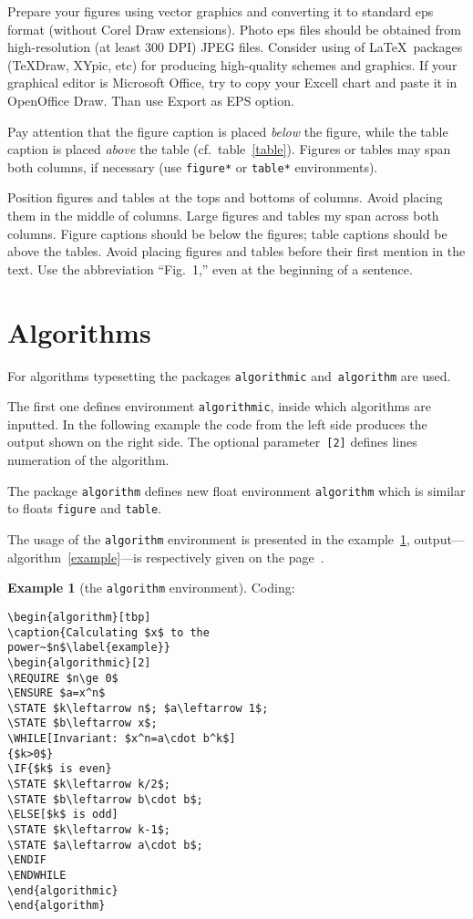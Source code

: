 \documentclass[conference]{IEEEtran}
\theoremstyle{definition}
\newtheorem{example}[remark]{Example}
\begin{document}
Prepare your figures using vector graphics and converting it to standard eps format (without Corel Draw extensions). Photo eps files should be obtained from high-resolution (at least 300 DPI) JPEG files. Consider using of \LaTeX\ packages (TeXDraw, XYpic, etc) for producing high-quality schemes and graphics. If your graphical editor is Microsoft Office, try to copy your Excell chart and paste it in OpenOffice Draw. Than use Export as EPS option.


Pay attention that the figure caption is placed \emph{below} the figure, while the table caption is placed \emph{above} the table (cf.~table~\ref{table}). Figures or tables may span both columns, if necessary (use \texttt{figure*} or \texttt{table*} environments).




Position figures and tables at the tops and bottoms of columns.  Avoid placing them in the middle of columns.  Large figures and tables my span across both columns.  Figure captions should be below the figures; table captions should be above the tables.  Avoid placing figures and tables before their first mention in the text.  Use the abbreviation ``Fig.~1,'' even at the beginning of a sentence.


\section{Algorithms}

For algorithms typesetting the packages \verb|algorithmic| and~\verb|algorithm| are used. 

The first one defines environment \verb|algorithmic|, inside which algorithms are inputted. In the following example the code from the left side produces the output shown on the right side. The optional parameter~\verb|[2]| defines lines numeration of the algorithm.

The  package \verb|algorithm| defines new float environment \verb|algorithm| which is  similar to floats \verb|figure| and \verb|table|. 

The usage of the \verb|algorithm| environment is presented in the example~\ref{algorytm}, output---algorithm~\ref{example}---is respectively given on the page~\pageref{example}.


\begin{example}[the \texttt{algorithm} environment]\label{algorytm}
Coding:\begin{verbatim}\begin{algorithm}[tbp]
\caption{Calculating $x$ to the 
power~$n$\label{example}}
\begin{algorithmic}[2]
\REQUIRE $n\ge 0$
\ENSURE $a=x^n$
\STATE $k\leftarrow n$; $a\leftarrow 1$; 
\STATE $b\leftarrow x$;
\WHILE[Invariant: $x^n=a\cdot b^k$]
{$k>0$}
\IF{$k$ is even}
\STATE $k\leftarrow k/2$;
\STATE $b\leftarrow b\cdot b$;
\ELSE[$k$ is odd]
\STATE $k\leftarrow k-1$;
\STATE $a\leftarrow a\cdot b$;
\ENDIF
\ENDWHILE
\end{algorithmic}
\end{algorithm}
\end{verbatim}
\end{example}
\end{document}
